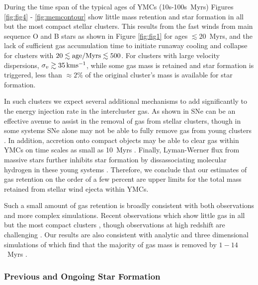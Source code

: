 \documentclass[fleqn,usenatbib]{mnras}
\begin{document}
 During the time span of the typical ages of YMCs (10s-100s~Myrs) Figures \ref{fig:fig4} - \ref{fig:memcontour} show little mass retention and star formation in all but the most compact stellar clusters.
 This results from the fast winds from main sequence O and B stars as shown in Figure \ref{fig:fig1} for ages $\lesssim 20$~Myrs, and the lack of sufficient gas accumulation time to initiate runaway cooling and collapse for clusters with $20 \lesssim {\rm age/Myrs} \lesssim 500$.
 For clusters with large velocity dispersions, $\sigma_v \gtrsim 35 \, {\rm km s^{-1}}$, while some gas mass is retained and star formation is triggered, less than $\approx 2$\% of the original cluster's mass is available for star formation.

 In such clusters we expect several additional mechanisms to add significantly to the energy injection rate in the intercluster gas.
 As shown in \cite{calura2015} SNe can be an effective avenue to assist in the removal of gas from stellar clusters, though in some systems SNe alone may not be able to fully remove gas from young clusters \citep{krause2013}.
 In addition, accretion onto compact objects may be able to clear gas within YMCs on time scales as small as 10~Myrs \citep{leigh2013a}.
 Finally, Lyman-Werner flux from massive stars further inhibits star formation by dissassociating molecular hydrogen in these young systems \citep{ten1986,conroy2011b,krause2013}.
 Therefore, we conclude that our estimates of gas retention on the order of a few percent are upper limits for the total mass retained from stellar wind ejecta within YMCs.

 Such a small amount of gas retention is broadly consistent with both observations and more complex simulations.
 Recent observations which show little gas in all but the most compact clusters \citep{bastian2014a,cabrera2015,krui2015,longmore2015}, though observations at high redshift are challenging \citep{longmore2015}.
 Our results are also consistent with analytic and three dimensional simulations of  which find that the majority of gas mass is removed by $1-14$~Myrs \citep{calura2015,krui2015}.


\subsubsection{Previous and Ongoing Star Formation} \label{section:YMCongoing}
\end{document}
